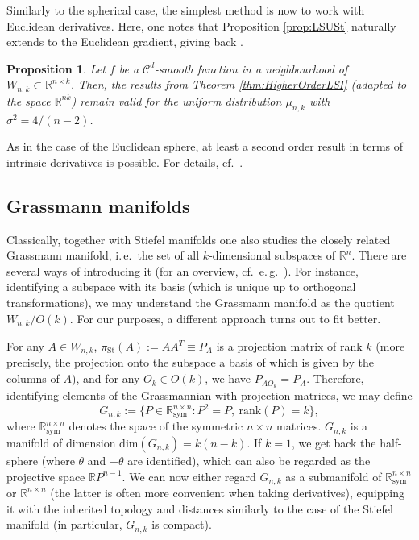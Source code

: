 \documentclass[a4paper,12pt]{amsart}
\numberwithin{equation}{section}
\newtheorem{proposition}[satz]{Proposition}
\theoremstyle{remark}
\def\R{{\mathbb R}}
\def\pist{\pi_\mathrm{St}}
\def\rank{\mathrm{rank}}
\def\Rns{\mathbb{R}^{n \times n}_\mathrm{sym}}
\begin{document}
Similarly to the spherical case, the simplest method is now to work with Euclidean derivatives. Here, one notes that Proposition \ref{prop:LSUSt} naturally extends to the Euclidean gradient, giving back \cite[Th.\ 1.3]{GS23}.

\begin{proposition}\label{prop:HigherOrderSt}
Let $f$ be a $\mathcal{C}^d$-smooth function in a neighbourhood of $W_{n,k} \subset \R^{n \times k}$. Then, the results from Theorem \ref{thm:HigherOrderLSI} (adapted to the space $\R^{nk}$) remain valid for the uniform distribution $\mu_{n,k}$ with $\sigma^2 = 4/(n-2)$.
\end{proposition}

As in the case of the Euclidean sphere, at least a second order result in terms of intrinsic derivatives is possible. For details, cf.\ \cite[Th.\ 1.3]{GS23}.

\subsection{Grassmann manifolds}

Classically, together with Stiefel manifolds one also studies the closely related Grassmann manifold, i.\,e.\ the set of all $k$-dimensional subspaces of $\mathbb{R}^n$. There are several ways of introducing it (for an overview, cf.\ e.\,g.\ \cite{BZA24}). For instance, identifying a subspace with its basis (which is unique up to orthogonal transformations), we may understand the Grassmann manifold as the quotient $W_{n,k}/O(k)$. For our purposes, a different approach turns out to fit better.

For any $A \in W_{n,k}$, $\pist(A) := AA^T \equiv P_A$ is a projection matrix of rank $k$ (more precisely, the projection onto the subspace a basis of which is given by the columns of $A$), and for any $O_k \in O(k)$, we have $P_{AO_k} = P_A$. Therefore, identifying elements of the Grassmannian with projection matrices, we may define
\[
G_{n,k} := \{P \in \Rns \colon P^2 = P, \ \rank(P) = k \},
\]
where $\Rns$ denotes the space of the symmetric $n \times n$ matrices. $G_{n,k}$ is a manifold of dimension $\mathrm{dim}(G_{n,k}) = k(n-k)$. If $k=1$, we get back the half-sphere (where $\theta$ and $-\theta$ are identified), which can also be regarded as the projective space $\mathbb{R}P^{n-1}$. We can now either regard $G_{n,k}$ as a submanifold of $\Rns$ or $\mathbb{R}^{n \times n}$ (the latter is often more convenient when taking derivatives), equipping it with the inherited topology and distances similarly to the case of the Stiefel manifold (in particular, $G_{n,k}$ is compact).
\end{document}
